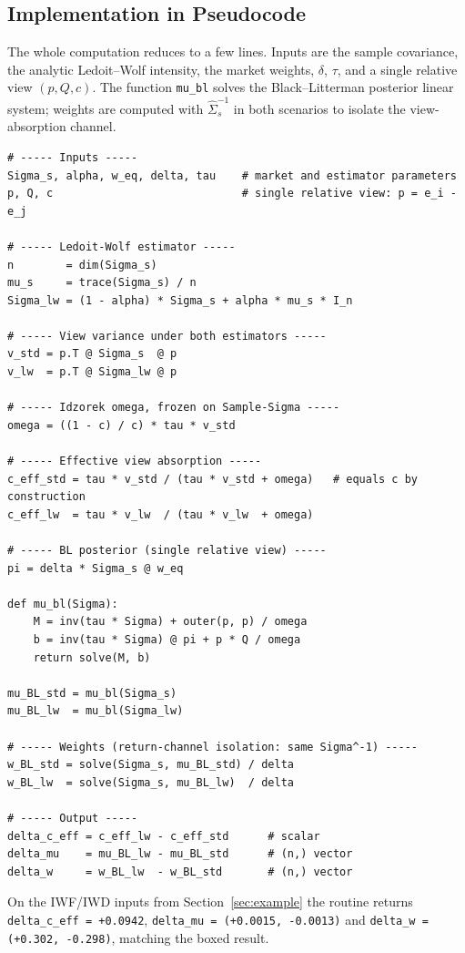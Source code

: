 \documentclass[a4paper,11pt]{article}
\theoremstyle{plain}
\theoremstyle{definition}
\begin{document}
\subsection{Implementation in Pseudocode}
\label{sec:pseudocode}

The whole computation reduces to a few lines. Inputs are the sample
covariance, the analytic Ledoit--Wolf intensity, the market weights,
$\delta$, $\tau$, and a single relative view $(p, Q, c)$. The function
\texttt{mu\_bl} solves the Black--Litterman posterior linear system;
weights are computed with $\hat\Sigma_s^{-1}$ in both scenarios to
isolate the view-absorption channel.

\begin{lstlisting}[caption={Single-view leakage computation.},label={lst:pseudo}]
# ----- Inputs -----
Sigma_s, alpha, w_eq, delta, tau    # market and estimator parameters
p, Q, c                             # single relative view: p = e_i - e_j

# ----- Ledoit-Wolf estimator -----
n        = dim(Sigma_s)
mu_s     = trace(Sigma_s) / n
Sigma_lw = (1 - alpha) * Sigma_s + alpha * mu_s * I_n

# ----- View variance under both estimators -----
v_std = p.T @ Sigma_s  @ p
v_lw  = p.T @ Sigma_lw @ p

# ----- Idzorek omega, frozen on Sample-Sigma -----
omega = ((1 - c) / c) * tau * v_std

# ----- Effective view absorption -----
c_eff_std = tau * v_std / (tau * v_std + omega)   # equals c by construction
c_eff_lw  = tau * v_lw  / (tau * v_lw  + omega)

# ----- BL posterior (single relative view) -----
pi = delta * Sigma_s @ w_eq

def mu_bl(Sigma):
    M = inv(tau * Sigma) + outer(p, p) / omega
    b = inv(tau * Sigma) @ pi + p * Q / omega
    return solve(M, b)

mu_BL_std = mu_bl(Sigma_s)
mu_BL_lw  = mu_bl(Sigma_lw)

# ----- Weights (return-channel isolation: same Sigma^-1) -----
w_BL_std = solve(Sigma_s, mu_BL_std) / delta
w_BL_lw  = solve(Sigma_s, mu_BL_lw)  / delta

# ----- Output -----
delta_c_eff = c_eff_lw - c_eff_std      # scalar
delta_mu    = mu_BL_lw - mu_BL_std      # (n,) vector
delta_w     = w_BL_lw  - w_BL_std       # (n,) vector
\end{lstlisting}

\noindent
On the IWF/IWD inputs from Section~\ref{sec:example} the routine returns
\texttt{delta\_c\_eff = +0.0942}, \texttt{delta\_mu = (+0.0015, -0.0013)}
and \texttt{delta\_w = (+0.302, -0.298)}, matching the boxed result.
\end{document}
